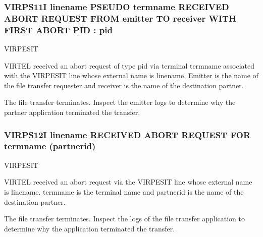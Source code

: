 \documentclass[letterpaper,10pt,english]{sphinxmanual}
\begin{document}
\subsubsection{VIRPS11I linename PSEUDO termname RECEIVED ABORT REQUEST FROM emitter TO receiver WITH FIRST ABORT PID : pid}
\label{\detokenize{messages:virps11i-linename-pseudo-termname-received-abort-request-from-emitter-to-receiver-with-first-abort-pid-pid}}\begin{description}
\sphinxAtStartPar
VIRPESIT

\sphinxAtStartPar
VIRTEL received an abort request of type pid via terminal termname associated with the VIRPESIT line whose external name is linename. Emitter is the name of the file transfer requester and receiver is the name of the destination partner.

\sphinxAtStartPar
The file transfer terminates. Inspect the emitter logs to determine why the partner application terminated the transfer.

\end{description}


\subsubsection{VIRPS12I linename RECEIVED ABORT REQUEST FOR termname (partnerid)}
\label{\detokenize{messages:virps12i-linename-received-abort-request-for-termname-partnerid}}\begin{description}
\sphinxAtStartPar
VIRPESIT

\sphinxAtStartPar
VIRTEL received an abort request via the VIRPESIT line whose external name is linename. termname is the terminal name and partnerid is the name of the destination partner.

\sphinxAtStartPar
The file transfer terminates. Inspect the logs of the file transfer application to determine why the application terminated the transfer.

\end{description}
\end{document}
